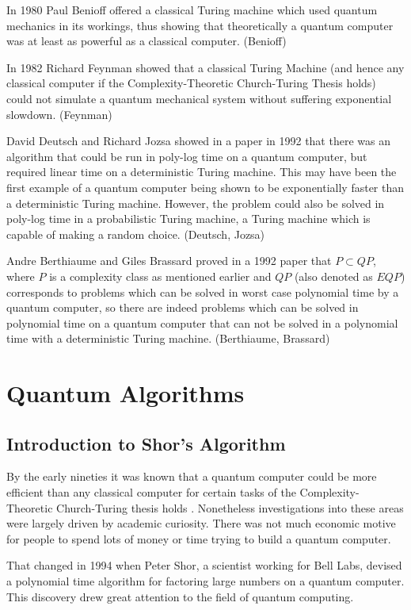 \documentclass[]{article}
\begin{document}
In 1980 Paul Benioff offered a classical Turing machine which used
quantum mechanics in its workings, thus showing that theoretically a
quantum computer was at least as powerful as a classical computer.
(Benioff)

In 1982 Richard Feynman showed that a classical Turing Machine (and
hence any classical computer if the Complexity-Theoretic Church-Turing
Thesis holds) could not simulate a quantum mechanical system without
suffering exponential slowdown.  (Feynman)

David Deutsch and Richard Jozsa showed in a paper in 1992 that there
was an algorithm that could be run in poly-log time on a quantum
computer, but required linear time on a deterministic Turing machine.
This may have been the first example of a quantum computer being shown
to be exponentially faster than a deterministic Turing
machine. However, the problem could also be solved in poly-log time in
a probabilistic Turing machine, a Turing machine which is capable of
making a random choice.  (Deutsch, Jozsa)

Andre Berthiaume and Giles Brassard proved in a 1992 paper that $P \subset QP$, where $P$ is a complexity class as mentioned earlier and
$QP$ (also denoted as $EQP$) corresponds to problems which can be
solved in worst case polynomial time by a quantum computer, so there
are indeed problems which can be solved in polynomial time on a
quantum computer that can not be solved in a polynomial time with a
deterministic Turing machine. (Berthiaume, Brassard)

\section{Quantum Algorithms}

\subsection{Introduction to Shor's Algorithm}

By the early nineties it was known that a quantum computer could be
more efficient than any classical computer for certain tasks of the
Complexity-Theoretic Church-Turing thesis holds .  Nonetheless
investigations into these areas were largely driven by academic
curiosity.  There was not much economic motive for people to spend
lots of money or time trying to build a quantum computer.

That changed in 1994 when Peter Shor, a scientist working for Bell
Labs, devised a polynomial time algorithm for factoring large numbers
on a quantum computer.  This discovery drew great attention to the
field of quantum computing.
\end{document}
